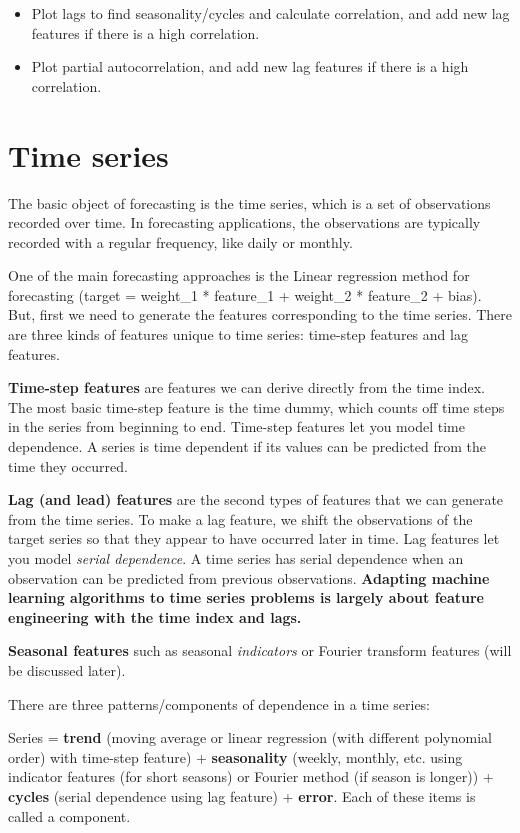 \documentclass[12pt]{report}
\begin{document}
\begin{itemize}
  \item Plot lags to find seasonality/cycles and calculate correlation, and add new lag features if there is a high correlation.
  \item Plot partial autocorrelation, and add new lag features if there is a high correlation.
\end{itemize}


\section{Time series}
The basic object of forecasting is the time series, which is a set of observations recorded over time. In forecasting applications, the observations are typically recorded with a regular frequency, like daily or monthly.

One of the main forecasting approaches is the Linear regression method for forecasting (target = weight\_1 * feature\_1 + weight\_2 * feature\_2 + bias). But, first we need to generate the features corresponding to the time series. There are three kinds of features unique to time series: time-step features and lag features.

\textbf{Time-step features} are features we can derive directly from the time index. The most basic time-step feature is the time dummy, which counts off time steps in the series from beginning to end. Time-step features let you model time dependence. A series is time dependent if its values can be predicted from the time they occurred.

\textbf{Lag (and lead) features} are the second types of features that we can generate from the time series. To make a lag feature, we shift the observations of the target series so that they appear to have occurred later in time. Lag features let you model \textit{serial dependence}. A time series has serial dependence when an observation can be predicted from previous observations. \textbf{Adapting machine learning algorithms to time series problems is largely about feature engineering with the time index and lags.}


\textbf{Seasonal features} such as seasonal \textit{indicators} or Fourier transform features (will be discussed later).

There are three patterns/components of dependence in a time series:

Series = \textbf{trend }(moving average or linear regression (with different polynomial order) with time-step feature) + \textbf{seasonality} (weekly, monthly, etc. using indicator features (for short seasons) or Fourier method (if season is longer)) + \textbf{cycles} (serial dependence using lag feature) + \textbf{error}. Each of these items is called a component.
\end{document}
